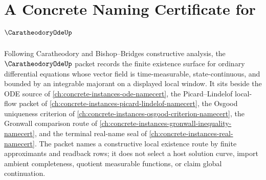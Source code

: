 \chapter{A Concrete Naming Certificate for $\CaratheodoryOdeUp$}
\label{ch:concrete-instances-caratheodory-ode-namecert}

Following Caratheodory and Bishop--Bridges constructive analysis, the $\CaratheodoryOdeUp$ packet records the finite existence surface for ordinary differential equations whose vector field is time-measurable, state-continuous, and bounded by an integrable majorant on a displayed local window. It sits beside the ODE source of \autoref{ch:concrete-instances-ode-namecert}, the Picard--Lindelof local-flow packet of \autoref{ch:concrete-instances-picard-lindelof-namecert}, the Osgood uniqueness criterion of \autoref{ch:concrete-instances-osgood-criterion-namecert}, the Gronwall comparison route of \autoref{ch:concrete-instances-gronwall-inequality-namecert}, and the terminal real-name seal of \autoref{ch:concrete-instances-real-namecert}. The packet names a constructive local existence route by finite approximants and readback rows; it does not select a host solution curve, import ambient completeness, quotient measurable functions, or claim global continuation.

